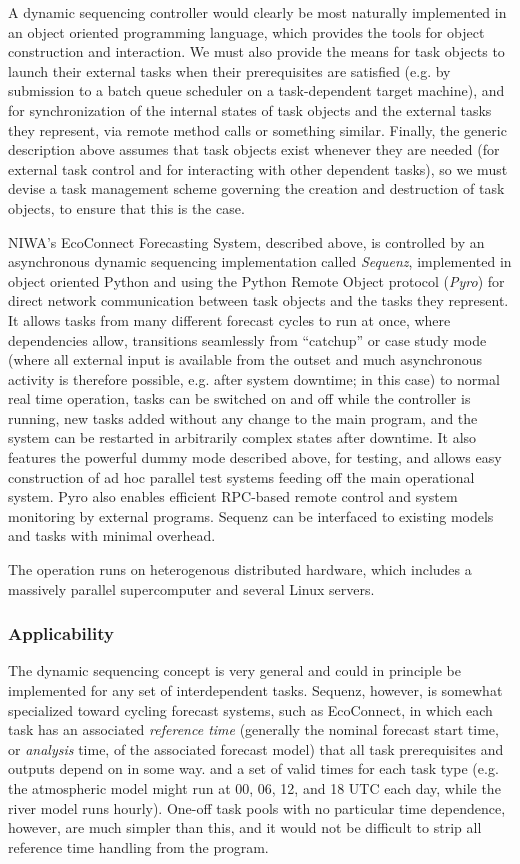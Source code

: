 \documentclass[11pt,a4paper]{article}
\begin{document}
A dynamic sequencing controller would clearly be most naturally
implemented in an object oriented programming language, which provides
the tools for object construction and interaction.  We must also provide
the means for task objects to launch their external tasks when their
prerequisites are satisfied (e.g.  by submission to a batch queue
scheduler on a task-dependent target machine), and for synchronization
of the internal states of task objects and the external tasks they
represent, via remote method calls or something similar.  Finally, the
generic description above assumes that task objects exist whenever they
are needed (for external task control and for interacting with other
dependent tasks), so we must devise a task management scheme governing
the creation and destruction of task objects, to ensure that this is the
case.

NIWA's EcoConnect Forecasting System, described above, is controlled by
an asynchronous dynamic sequencing implementation called {\em Sequenz},
implemented in object oriented Python and using the Python Remote Object
protocol ({\em Pyro}) for direct network communication between task
objects and the tasks they represent. It allows tasks from many
different forecast cycles to run at once, where dependencies allow,
transitions seamlessly from ``catchup'' or case study mode (where all
external input is available from the outset and much asynchronous
activity is therefore possible, e.g. after system downtime; in this
case) to normal real time operation, tasks can be switched on and off
while the controller is running, new tasks added without any change to
the main program, and the system can be restarted in arbitrarily complex
states after downtime.  It also features the powerful dummy mode
described above, for testing, and allows easy construction of ad hoc
parallel test systems feeding off the main operational system. Pyro also
enables efficient RPC-based remote control and system monitoring by
external programs.  Sequenz can be interfaced to existing models and
tasks with minimal overhead. 

The operation runs on heterogenous distributed
hardware, which includes a massively parallel supercomputer and several
Linux servers. 

\subsubsection{Applicability}

The dynamic sequencing concept is very general and could in principle be
implemented for any set of interdependent tasks. Sequenz, however, is
somewhat specialized toward cycling forecast systems, such as
EcoConnect, in which each task has an associated {\em reference time}
(generally the nominal forecast start time, or {\em analysis} time, of
the associated forecast model) that all task prerequisites and outputs
depend on in some way. and a set of valid times for each task type (e.g.
the atmospheric model might run at 00, 06, 12, and 18 UTC each day,
while the river model runs hourly).  One-off task pools with no
particular time dependence, however, are much simpler than this, and it
would not be difficult to strip all reference time handling from the
program.
\end{document}
